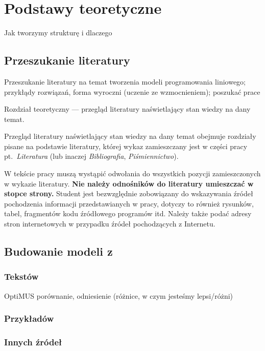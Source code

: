 
\chapter{Podstawy teoretyczne}

Jak tworzymy strukturę i dlaczego

\section{Przeszukanie literatury}
Przeszukanie literatury na temat tworzenia modeli programowania liniowego; przykłądy rozwiązań, forma wyroczni (uczenie ze wzmocnieniem); poszukać prace

Rozdział teoretyczny --- przegląd literatury naświetlający stan wiedzy na dany temat. 

Przegląd literatury naświetlający stan wiedzy na dany temat obejmuje rozdziały pisane na podstawie
literatury, której wykaz zamieszczany jest w części pracy pt.~\emph{Literatura} (lub inaczej \emph{Bibliografia}, \emph{Piśmiennictwo}).

W tekście pracy muszą wystąpić odwołania do wszystkich pozycji zamieszczonych w
wykazie literatury. \textbf{Nie należy odnośników do literatury umieszczać w stopce strony.} Student jest
bezwzględnie zobowiązany do wskazywania źródeł pochodzenia informacji przedstawianych w pracy,
dotyczy to również rysunków, tabel, fragmentów kodu źródłowego programów itd. Należy także podać
adresy stron internetowych w przypadku źródeł pochodzących z Internetu.


\section{Budowanie modeli z}
\subsection{Tekstów}
OptiMUS porównanie, odniesienie (różnice, w czym jesteśmy lepsi/różni)

\subsection{Przykładów}

\subsection{Innych źródeł}


